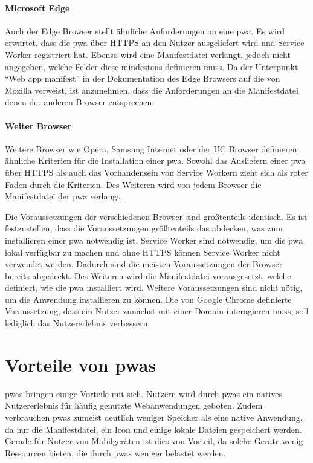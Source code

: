 \documentclass[12pt, parskip=half]{scrartcl}       %
\begin{document}
\paragraph{Microsoft Edge}
Auch der Edge Browser stellt ähnliche Anforderungen an eine \ac{pwa}.
Es wird erwartet, dass die \ac{pwa} über HTTPS an den Nutzer ausgeliefert wird und Service Worker registriert hat.
Ebenso wird eine Manifestdatei verlangt, jedoch nicht angegeben, welche Felder diese mindestens definieren muss.
Da der Unterpunkt \enquote{Web app manifest} in der Dokumentation des Edge Browsers auf die von Mozilla verweist, ist anzunehmen, dass die Anforderungen an die Manifestdatei denen der anderen Browser entsprechen.

\paragraph{Weiter Browser}
Weitere Browser wie Opera\cite{devopera_pwainstallcriteria}, Samsung Internet\cite{samsung_pwainstallcriteria} oder der UC Browser\cite{ucweb_pwainstallcriteria} definieren ähnliche Kriterien für die Installation einer \ac{pwa}.
Sowohl das Ausliefern einer \ac{pwa} über HTTPS als auch das Vorhandensein von Service Workern zieht sich als roter Faden durch die Kriterien.
Des Weiteren wird von jedem Browser die Manifestdatei der \ac{pwa} verlangt.

Die Voraussetzungen der verschiedenen Browser sind größtenteils identisch.
Es ist festzustellen, dass die Voraussetzungen größtenteils das abdecken, was zum installieren einer \ac{pwa} notwendig ist.
Service Worker sind notwendig, um die \ac{pwa} lokal verfügbar zu machen und ohne HTTPS können Service Worker nicht verwendet werden.
Dadurch sind die meisten Voraussetzungen der Browser bereits abgedeckt.
Des Weiteren wird die Manifestdatei vorausgesetzt, welche definiert, wie die \ac{pwa} installiert wird.
Weitere Voraussetzungen sind nicht nötig, um die Anwendung installieren zu können.
Die von Google Chrome definierte Voraussetzung, dass ein Nutzer zunächst mit einer Domain interagieren muss, soll lediglich das Nutzererlebnis verbessern.

\newpage

\section{Vorteile von \acp{pwa}}
\label{sec:vorteile}

\acp{pwa} bringen einige Vorteile mit sich.
Nutzern wird durch \acp{pwa} ein natives Nutzererlebnis für häufig genutzte Webanwendungen geboten.
Zudem verbrauchen \acp{pwa} zumeist deutlich weniger Speicher als eine native Anwendung, da nur die Manifestdatei, ein Icon und einige lokale Dateien gespeichert werden.
Gerade für Nutzer von Mobilgeräten ist dies von Vorteil, da solche Geräte wenig Ressourcen bieten, die durch \acp{pwa} weniger belastet werden.
\end{document}
